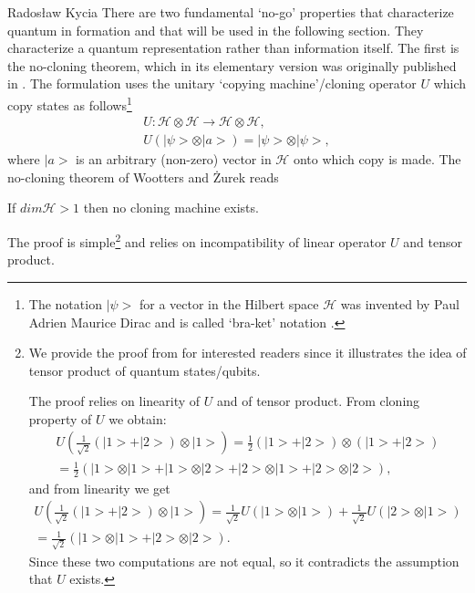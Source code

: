 \begin{artengenv}{Radosław Kycia}
There are two fundamental `no-go' properties that characterize quantum in formation and that will be used in the following section. They characterize a quantum representation rather than information itself. The first is the no-cloning theorem, which in its elementary version was originally published in \parencite{NoCloning_WootersZurek}. The formulation uses the unitary `copying machine'/cloning operator $U$ which copy states as follows\footnote{The notation $|\psi>$ for a vector in the Hilbert space $\mathcal{H}$ was invented by Paul Adrien Maurice Dirac and is called `bra-ket' notation \parencite{QuantumComputing}.}
\begin{equation}
 \begin{array}{c}
  U: \mathcal{H} \otimes \mathcal{H} \rightarrow \mathcal{H}\otimes \mathcal{H}, \\
  U( | \psi> \otimes |a >) = | \psi> \otimes |\psi >,
 \end{array}
\end{equation}
where $|a>$ is an arbitrary (non-zero) vector in $\mathcal{H}$ onto which copy is made. The no-cloning theorem of Wootters and \.{Z}urek reads
\begin{Theorem}
\label{Th.NoClonning}
 If $dim\mathcal{H}>1$ then no cloning machine exists.
\end{Theorem}

The proof is simple\footnote{
We provide the proof from \parencite{NoCloning_WootersZurek} for interested readers since it illustrates the idea of tensor product of quantum states/qubits.

 The proof relies on linearity of $U$ and of tensor product. From cloning property of $U$ we obtain:
 \begin{equation}
 \begin{array}{c}
  U\left( \frac{1}{\sqrt{2}}(|1>+|2>)\otimes|1>\right)  =  \frac{1}{2}(|1>+|2>)\otimes(|1>+|2>) \\ 
  =\frac{1}{2}(|1>\otimes|1>+|1>\otimes|2>+|2>\otimes|1>+|2>\otimes|2>),
 \end{array}
 \end{equation}
and from linearity we get
\begin{equation}
\begin{array}{c}
 U\left( \frac{1}{\sqrt{2}}(|1>+|2>)\otimes|1>\right)  = \frac{1}{\sqrt{2}} U(|1>\otimes |1>) + \frac{1}{\sqrt{2}} U(|2>\otimes |1>)  \\ 
  =\frac{1}{\sqrt{2}}(|1>\otimes|1>+|2>\otimes|2>).
\end{array}
\end{equation}
Since these two computations are not equal, so it contradicts the assumption that $U$ exists.
} and relies on incompatibility of linear operator $U$ and tensor product.



\end{artengenv}
